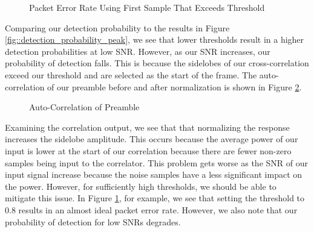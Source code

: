 \documentclass{article}
\begin{document}
\begin{figure}[H]
	\centerline{}
	\caption{Packet Error Rate Using First Sample That Exceeds Threshold}
	\label{fig::per_first}
\end{figure}

\noindent Comparing our detection probability to the results in Figure \ref{fig::detection_probability_peak}, we see that lower thresholds result in a higher detection probabilities at low SNR. However, as our SNR increases, our probability of detection falls. This is because the sidelobes of our cross-correlation exceed our threshold and are selected as the start of the frame. The auto-correlation of our preamble before and after normalization is shown in Figure \ref{fig::auto_corr_preamble}.

\begin{figure}[H]
	\centerline{}
	\caption{Auto-Correlation of Preamble}
	\label{fig::auto_corr_preamble}
\end{figure}

\noindent Examining the correlation output, we see that that normalizing the response increases the sidelobe amplitude. This occurs because the average power of our input is lower at the start of our correlation because there are fewer non-zero samples being input to the correlator. This problem gets worse as the SNR of our input signal increase because the noise samples have a less significant impact on the power. However, for sufficiently high thresholds, we should be able to mitigate this issue. In Figure \ref{fig::per_first}, for example, we see that setting the threshold to 0.8 results in an almost ideal packet error rate. However, we also note that our probability of detection for low SNRs degrades.
\end{document}
